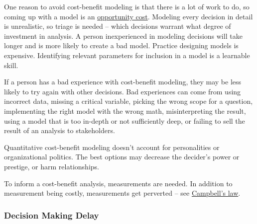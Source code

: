 One reason to avoid cost-benefit modeling is that there is a lot of work to do, so coming up with a model is an \href{https://en.wikipedia.org/wiki/Opportunity_cost}{opportunity cost}. Modeling every decision in detail is unrealistic, so triage is needed -- which decisions warrant what degree of investment in analysis. A person inexperienced in modeling decisions will take longer and is more likely to create a bad model. Practice designing models is expensive. Identifying relevant parameters for inclusion in a model is a learnable skill. 

If a person has a bad experience with cost-benefit modeling, they may be less likely to try again with other decisions. Bad experiences can come from using incorrect data, missing a critical variable, picking the wrong scope for a question, implementing the right model with the wrong math, misinterpreting the result, using a model that is too in-depth or not sufficiently deep, or failing to sell the result of an analysis to stakeholders.

Quantitative cost-benefit modeling doesn't account for personalities or organizational politics. The best options may decrease the decider's power or prestige, or harm relationships. 

To inform a cost-benefit analysis, measurements are needed. In addition to measurement being costly, measurements get perverted -- see \href{https://en.wikipedia.org/wiki/Campbell\%27s_law}{Campbell's law}. 

\subsubsection{Decision Making Delay\label{sec:decision-delay}}

